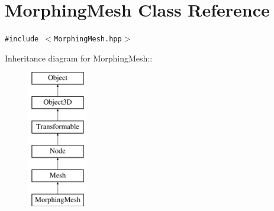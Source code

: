 \hypertarget{classm3g_1_1MorphingMesh}{
\section{MorphingMesh Class Reference}
\label{classm3g_1_1MorphingMesh}
}
{\tt \#include $<$MorphingMesh.hpp$>$}

Inheritance diagram for MorphingMesh::\begin{figure}[H]
\begin{center}
\leavevmode
\includegraphics[height=6cm]{classm3g_1_1MorphingMesh}
\end{center}
\end{figure}
